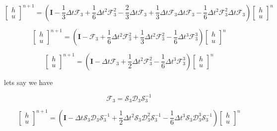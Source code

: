 \documentclass[12pt]{article}
\begin{document}
\[\left[\begin{array}{c}
h \\ u
\end{array}\right]^{n+1} = \left(\boldsymbol{I}  -  \frac{1}{3}\Delta t\boldsymbol{\mathcal{F}}_3 + \frac{1}{6}\Delta t^2\boldsymbol{\mathcal{F}}_3^2 -\frac{2}{3} \Delta t\boldsymbol{\mathcal{F}}_3   + \frac{1}{3}\Delta t\boldsymbol{\mathcal{F}}_3 \Delta t\boldsymbol{\mathcal{F}}_3 - \frac{1}{6}\Delta t^2\boldsymbol{\mathcal{F}}_3^2 \Delta t\boldsymbol{\mathcal{F}}_3 \right) \left[\begin{array}{c}
h \\ u
\end{array}\right]^n\]

\[\left[\begin{array}{c}
h \\ u
\end{array}\right]^{n+1} = \left(\boldsymbol{I}  -  \boldsymbol{\mathcal{F}}_3 + \frac{1}{6}\Delta t^2\boldsymbol{\mathcal{F}}_3^2   + \frac{1}{3}\Delta t^2\boldsymbol{\mathcal{F}}_3^2- \frac{1}{6}\Delta t^3\boldsymbol{\mathcal{F}}_3^3 \right) \left[\begin{array}{c}
h \\ u
\end{array}\right]^n\]

\[\left[\begin{array}{c}
h \\ u
\end{array}\right]^{n+1} = \left(\boldsymbol{I}  -  \Delta t\boldsymbol{\mathcal{F}}_3   + \frac{1}{2}\Delta t^2\boldsymbol{\mathcal{F}}_3^2- \frac{1}{6}\Delta t^3\boldsymbol{\mathcal{F}}_3^3 \right) \left[\begin{array}{c}
h \\ u
\end{array}\right]^n\]

lets say we have 

\[\boldsymbol{\mathcal{F}}_3 = \boldsymbol{\mathcal{S}}_3 \boldsymbol{\mathcal{D}}_3 \boldsymbol{\mathcal{S}}_3^{-1}  \]

\[\left[\begin{array}{c}
h \\ u
\end{array}\right]^{n+1} = \left(\boldsymbol{I}  -  \Delta t\boldsymbol{\mathcal{S}}_3 \boldsymbol{\mathcal{D}}_3 \boldsymbol{\mathcal{S}}_3^{-1}   + \frac{1}{2}\Delta t^2\boldsymbol{\mathcal{S}}_3 \boldsymbol{\mathcal{D}}_3^2 \boldsymbol{\mathcal{S}}_3^{-1}- \frac{1}{6}\Delta t^3\boldsymbol{\mathcal{S}}_3 \boldsymbol{\mathcal{D}}_3^3 \boldsymbol{\mathcal{S}}_3^{-1} \right) \left[\begin{array}{c}
h \\ u
\end{array}\right]^n\]
\end{document}
